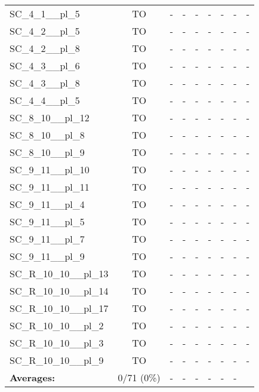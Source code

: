 \documentclass{article}
\begin{document}
\begin{tabular}{lcccccccc}
SC\_4\_1\_\_pl\_5 & TO & - & - & - & - & - & - & - \\
SC\_4\_2\_\_pl\_5 & TO & - & - & - & - & - & - & - \\
SC\_4\_2\_\_pl\_8 & TO & - & - & - & - & - & - & - \\
SC\_4\_3\_\_pl\_6 & TO & - & - & - & - & - & - & - \\
SC\_4\_3\_\_pl\_8 & TO & - & - & - & - & - & - & - \\
SC\_4\_4\_\_pl\_5 & TO & - & - & - & - & - & - & - \\
SC\_8\_10\_\_pl\_12 & TO & - & - & - & - & - & - & - \\
SC\_8\_10\_\_pl\_8 & TO & - & - & - & - & - & - & - \\
SC\_8\_10\_\_pl\_9 & TO & - & - & - & - & - & - & - \\
SC\_9\_11\_\_pl\_10 & TO & - & - & - & - & - & - & - \\
SC\_9\_11\_\_pl\_11 & TO & - & - & - & - & - & - & - \\
SC\_9\_11\_\_pl\_4 & TO & - & - & - & - & - & - & - \\
SC\_9\_11\_\_pl\_5 & TO & - & - & - & - & - & - & - \\
SC\_9\_11\_\_pl\_7 & TO & - & - & - & - & - & - & - \\
SC\_9\_11\_\_pl\_9 & TO & - & - & - & - & - & - & - \\
SC\_R\_10\_10\_\_pl\_13 & TO & - & - & - & - & - & - & - \\
SC\_R\_10\_10\_\_pl\_14 & TO & - & - & - & - & - & - & - \\
SC\_R\_10\_10\_\_pl\_17 & TO & - & - & - & - & - & - & - \\
SC\_R\_10\_10\_\_pl\_2 & TO & - & - & - & - & - & - & - \\
SC\_R\_10\_10\_\_pl\_3 & TO & - & - & - & - & - & - & - \\
SC\_R\_10\_10\_\_pl\_9 & TO & - & - & - & - & - & - & - \\
\textbf{Averages:} & 0/71 (0\%) & - & - & - & - & - & - & \\
\bottomrule
\end{tabular}
\\[0.7cm]
\end{document}
